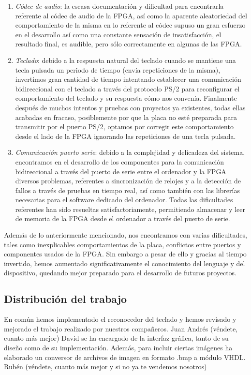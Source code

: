 \documentclass{article}
\begin{document}
\begin{enumerate}
	\item {\itshape Códec de audio}: la escasa documentación y dificultad para encontrarla referente al códec de audio de la FPGA, así como la aparente aleatoriedad del comportamiento de la misma en lo referente al códec supuso un gran esfuerzo en el desarrollo así como una constante sensación de insatisfacción, el resultado final, es audible, pero sólo correctamente en algunas de las FPGA.

	\item {\itshape Teclado}: debido a la respuesta natural del teclado cuando se mantiene una tecla pulsada un periodo de tiempo (envía repeticiones de la misma), invertimos gran cantidad de tiempo intentando establecer una comunicación bidireccional con el teclado a través del protocolo PS/2 para reconfigurar el comportamiento del teclado y su respuesta cómo nos convenía. Finalmente después de muchos intentos y pruebas con proyectos ya existentes, todas ellas acabadas en fracaso, posiblemente por que la placa no esté preparada para transmitir por el puerto PS/2, optamos por corregir este comportamiento desde el lado de la FPGA ignorando las repeticiones de una tecla pulsada.

	\item {\itshape Comunicación puerto serie}: debido a la complejidad y delicadeza del sistema, encontramos en el desarrollo de los componentes para la comunicación bidireccional a través del puerto de serie entre el ordenador y la FPGA diversos problemas, referentes a sincronización de relojes y a la detección de fallos a través de pruebas en tiempo real, así como también con las librerías necesarias para el software dedicado del ordenador.
	Todas las dificultades referentes han sido resueltas satisfactoriamente, permitiendo almacenar y leer de memoria de la FPGA desde el ordenador a través del puerto de serie.
\end{enumerate}

Además de lo anteriormente mencionado, nos encontramos con varias dificultades, tales como inexplicables comportamientos de la placa, conflictos entre puertos y componentes usados de la FPGA.
Sin embargo a pesar de ello y gracias al tiempo invertido, hemos aumentado significativamente el conocimiento del lenguaje y del dispositivo, quedando mejor preparado para el desarrollo de futuros proyectos.

\subsection{Distribución del trabajo}
En común hemos implementado el reconocedor del teclado y hemos revisado y mejorado el trabajo realizado por nuestros compañeros.
Juan Andrés (véndete, cuanto más mejor)
David se ha encargado de la interfaz gráfica, tanto de su diseño como de su implementación. Además, para incluir ciertas imágenes ha elaborado un conversor de archivos de imagen en formato .bmp a módulo VHDL.
Rubén (véndete, cuanto más mejor y si no ya te vendemos nosotros)
\end{document}
